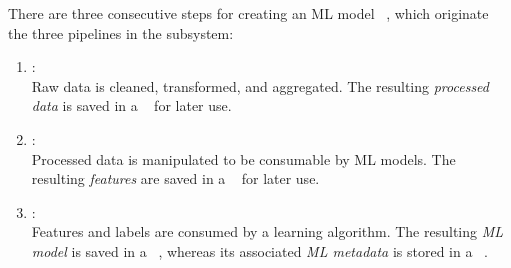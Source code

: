   There are three consecutive steps for creating an ML model%
  ~\parencite{Microsoft2021TeamDocumentation,Wirth2000CRISP-DMMining},
  which originate the three pipelines in the
   subsystem:
  \begin{enumerate}
      \item {}: \\
            Raw data is cleaned, transformed, and aggregated.
            The resulting \emph{processed data} is saved in a
            ~\parencite{Kleppmann2017DesigningSystems,
            Reis2022FundamentalsSystems} for later use.
      \item {}: \\
            Processed data is manipulated to be consumable by ML models.
            The resulting \emph{features} are saved in a
            ~\parencite{Lakshmanan2020MachineMLOps} for later use.
      \item {}: \\
            Features and labels are consumed by a learning algorithm.
            The resulting \emph{ML model} is saved in a
            ~\parencite{Lakshmanan2020MachineMLOps},
            whereas its associated \emph{ML metadata} is stored in a
            ~\parencite{Lakshmanan2020MachineMLOps}.
  \end{enumerate}

